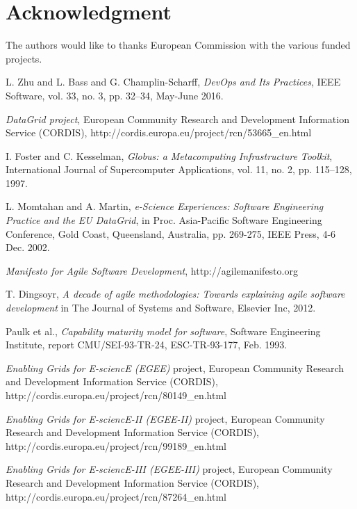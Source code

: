 \documentclass[journal]{IEEEtran}
\begin{document}
\section*{Acknowledgment}

The authors would like to thanks European Commission with the various funded
projects.

\begin{thebibliography}{1}

L. Zhu and L. Bass and G. Champlin-Scharff, \emph{DevOps and Its Practices},
IEEE Software, vol. 33, no. 3, pp. 32--34, May-June 2016.


\emph{DataGrid project}, European Community Research and Development
Information Service (CORDIS),
http://cordis.europa.eu/project/rcn/53665\_en.html

I. Foster and C. Kesselman, \emph{Globus: a Metacomputing Infrastructure
Toolkit}, International Journal of Supercomputer Applications, vol. 11, no. 2,
pp. 115–128, 1997.

L. Momtahan and A. Martin, \emph{e-Science Experiences: Software Engineering
Practice and the EU DataGrid}, in Proc. Asia-Pacific Software Engineering
Conference, Gold Coast, Queensland, Australia, pp. 269-275, IEEE Press,
4-6 Dec. 2002.

\emph{Manifesto for Agile Software Development}, http://agilemanifesto.org

T. Dingsoyr, \emph{A decade of agile methodologies: Towards explaining agile
software development} in The Journal of Systems and Software, Elsevier Inc,
2012.

Paulk et al., \emph{Capability maturity model for software}, Software
Engineering Institute, report CMU/SEI-93-TR-24, ESC-TR-93-177, Feb. 1993.

\emph{Enabling Grids for E-sciencE (EGEE)} project, European Community
Research and Development Information Service (CORDIS),
http://cordis.europa.eu/project/rcn/80149\_en.html

\emph{Enabling Grids for E-sciencE-II (EGEE-II)} project, European Community
Research and Development Information Service (CORDIS),
http://cordis.europa.eu/project/rcn/99189\_en.html

\emph{Enabling Grids for E-sciencE-III (EGEE-III)} project, European Community
Research and Development Information Service (CORDIS),
http://cordis.europa.eu/project/rcn/87264\_en.html


\end{thebibliography}
\end{document}
